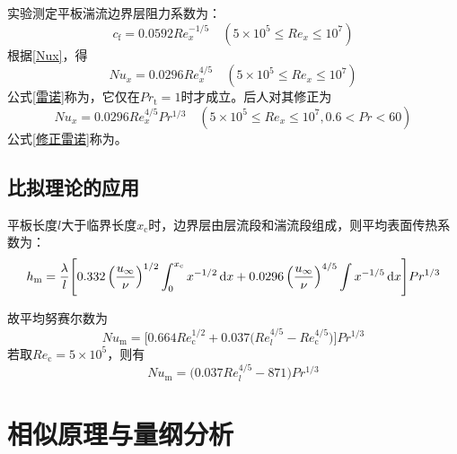 实验测定平板湍流边界层阻力系数为：
\begin{equation}
	c_\text{f} = 0.0592Re_x^{-1/5} \quad (5\times 10^5 \le Re_x \le 10^7)
\end{equation}
根据\eqref{Nux}，得
\begin{equation}
	Nu_x = 0.0296Re_x^{4/5} \quad (5\times 10^5 \le Re_x \le 10^7)
	\label{雷诺}
\end{equation}
公式\eqref{雷诺}称为，它仅在$Pr_\text{t} = 1$时才成立。后人对其修正为
\begin{equation}
	Nu_x = 0.0296Re_x^{4/5}Pr^{1/3} \quad (5\times 10^5 \le Re_x \le 10^7,0.6<Pr<60)
	\label{修正雷诺}
\end{equation}
公式\eqref{修正雷诺}称为。
\vspace*{0.5em}

\subsection{比拟理论的应用}
平板长度$l$大于临界长度$x_\text{c}$时，边界层由层流段和湍流段组成，则平均表面传热系数为：
\begin{equation}
	h_\text{m} = \dfrac{\lambda}{l}\Bigg[0.332\left(\dfrac{u_\infty}{\nu}\right)^{1/2}\int_0^{x_\text{c}}x^{-1/2}\, {\rm{d}} x + 0.0296 \left(\dfrac{u_\infty}{\nu}\right)^{4/5}\int x^{-1/5}\, {\rm{d}} x\Bigg]Pr^{1/3}
\end{equation}

故平均努赛尔数为
\begin{equation}
	Nu_\text{m} = \bigg[0.664Re_{\text{c}}^{1/2} + 0.037\big(Re_l^{4/5}-Re_\text{c}^{4/5}\big)\bigg]Pr^{1/3}
\end{equation}
若取$Re_\text{c} = 5 \times 10^5$，则有
\begin{equation}
	Nu_\text{m} = \big(0.037Re_l^{4/5} - 871\big)Pr^{1/3}
\end{equation}


\section{相似原理与量纲分析}



























